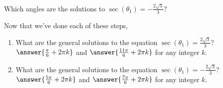 \documentclass{ximera}
\begin{document}
\begin{exercise}
\begin{exercise}
\begin{exercise}
\begin{exercise}
\begin{exercise}
Which angles are the solutions to $\sec(\theta_1) = -\frac{2\sqrt{3}}{3}$? 
\begin{multipleChoice}
\end{multipleChoice}


\begin{exercise} Now that we've done each of these steps, 
\begin{enumerate} 
\item What are the general solutions to the equation $\sec(\theta_1) = \frac{2\sqrt{3}}{3}$? \\
$\answer{\frac{\pi}{6} + 2\pi k}$ and $\answer{\frac{11\pi}{6} + 2\pi k}$ for any integer $k$.

\item What are the general solutions to the equation $\sec(\theta_1) = -\frac{2\sqrt{3}}{3}$?\\
$\answer{\frac{5\pi}{6} + 2\pi k}$ and $\answer{\frac{7\pi}{6} + 2\pi k}$ for any integer $k$.

\end{enumerate}
	
\end{exercise}	
\end{exercise}
\end{exercise}
\end{exercise}
\end{exercise}
\end{exercise}
\end{document}
